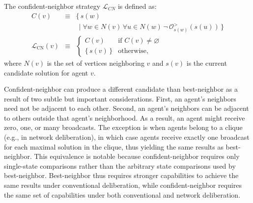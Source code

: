 \begin{definition}
The confident-neighbor strategy $\mathcal{L}_{CN}$ is defined as:
\begin{eqnarray}
C(v) &\equiv& \{
\, s(w)  \nonumber \\
&& \,
\mid
\forall w \!\in\! N(v) \, \forall u \!\in\! N(w) \,
\lnot \, \mathcal{O}^{>}_{s(w)}(s(u)) \,
\}
\\
\mathcal{L}_{\text{CN}}(v)
&\equiv& 
\begin{cases}
C(v) & \text{if } C(v) \neq \varnothing \\
\{ \, s(v) \, \}& \text{otherwise,}
\end{cases}
\end{eqnarray}
where $N(v)$ is the set of vertices neighboring $v$ and $s(v)$ is the current candidate solution for agent $v$.
\end{definition}

Confident-neighbor can produce a different candidate than best-neighbor as a result of two subtle but important considerations.
First, an agent's neighbors need not be adjacent to each other. Second, an agent's neighbors can be adjacent to others outside that agent's neighborhood. As a result, an agent might receive zero, one, or many broadcasts.
The exception is when agents belong to a clique (e.g., in network deliberation), in which case agents receive exactly one broadcast for each maximal solution in the clique, thus yielding the same results as best-neighbor.
This equivalence is notable because confident-neighbor requires only single-state
comparisons rather than the arbitrary state comparisons used by best-neighbor.
Best-neighbor thus requires stronger capabilities to achieve the same results under conventional deliberation,
while confident-neighbor requires the same set of capabilities under both conventional and network deliberation.


